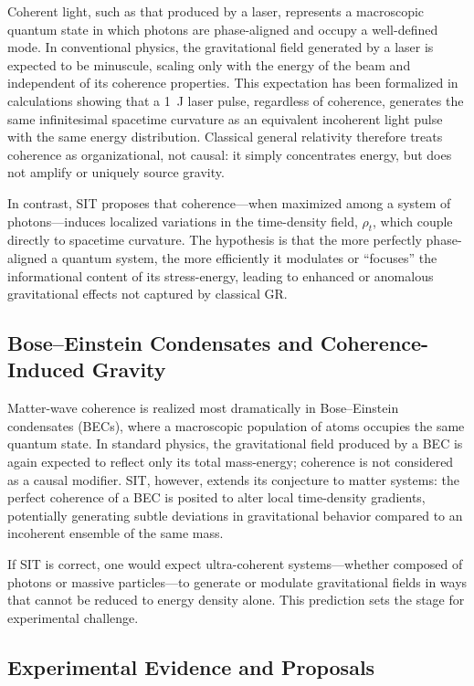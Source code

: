 \documentclass[american,11pt,letterpaper]{article}
\begin{document}
Coherent light, such as that produced by a laser, represents a macroscopic quantum state in which photons are phase-aligned and occupy a well-defined mode. In conventional physics, the gravitational field generated by a laser is expected to be minuscule, scaling only with the energy of the beam and independent of its coherence properties. This expectation has been formalized in calculations showing that a 1~J laser pulse, regardless of coherence, generates the same infinitesimal spacetime curvature as an equivalent incoherent light pulse with the same energy distribution. Classical general relativity therefore treats coherence as organizational, not causal: it simply concentrates energy, but does not amplify or uniquely source gravity.

In contrast, SIT proposes that coherence---when maximized among a system of photons---induces localized variations in the time-density field, $\rho_t$, which couple directly to spacetime curvature. The hypothesis is that the more perfectly phase-aligned a quantum system, the more efficiently it modulates or ``focuses'' the informational content of its stress-energy, leading to enhanced or anomalous gravitational effects not captured by classical GR.

\subsection{Bose--Einstein Condensates and Coherence-Induced Gravity}

Matter-wave coherence is realized most dramatically in Bose--Einstein condensates (BECs), where a macroscopic population of atoms occupies the same quantum state. In standard physics, the gravitational field produced by a BEC is again expected to reflect only its total mass-energy; coherence is not considered as a causal modifier. SIT, however, extends its conjecture to matter systems: the perfect coherence of a BEC is posited to alter local time-density gradients, potentially generating subtle deviations in gravitational behavior compared to an incoherent ensemble of the same mass.

If SIT is correct, one would expect ultra-coherent systems---whether composed of photons or massive particles---to generate or modulate gravitational fields in ways that cannot be reduced to energy density alone. This prediction sets the stage for experimental challenge.


\subsection{Experimental Evidence and Proposals}
\end{document}
